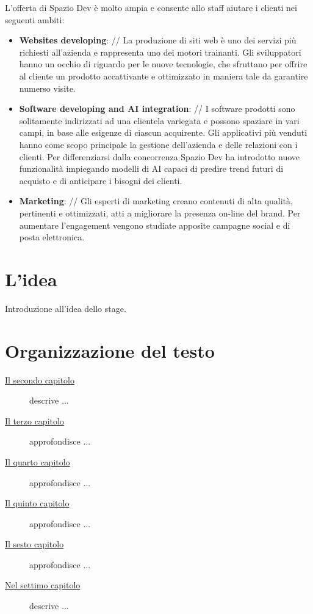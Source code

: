 L'offerta di Spazio Dev è molto ampia e consente allo staff  aiutare i clienti nei seguenti ambiti:
\begin{itemize}
  \item \textbf{Websites developing}: // La produzione di siti web è uno dei servizi più richiesti all'azienda e rappresenta uno dei motori trainanti. Gli sviluppatori hanno un occhio di riguardo per le nuove tecnologie, che sfruttano per offrire al cliente un prodotto accattivante e ottimizzato in maniera tale da garantire numerso visite.
  \item \textbf{Software developing and AI integration}: // I software prodotti sono solitamente indirizzati ad una clientela variegata e possono spaziare in vari campi, in base alle esigenze di ciascun acquirente. Gli applicativi più venduti hanno come scopo principale la gestione dell'azienda e delle relazioni con i clienti. Per differenziarsi dalla concorrenza Spazio Dev ha introdotto nuove funzionalità impiegando modelli di AI capaci di predire trend futuri di acquisto e  di anticipare i bisogni dei clienti.
  \item \textbf{Marketing}: // Gli esperti di marketing creano contenuti di alta qualità, pertinenti e ottimizzati, atti a migliorare la presenza on-line del brand. Per aumentare l'engagement vengono studiate apposite campagne social e di posta elettronica.
\end{itemize}
\section{L'idea}

Introduzione all'idea dello stage.

\section{Organizzazione del testo}

\begin{description}
    \item[{\hyperref[cap:processi-metodologie]{Il secondo capitolo}}] descrive ...
    
    \item[{\hyperref[cap:descrizione-stage]{Il terzo capitolo}}] approfondisce ...
    
    \item[{\hyperref[cap:analisi-requisiti]{Il quarto capitolo}}] approfondisce ...
    
    \item[{\hyperref[cap:progettazione-codifica]{Il quinto capitolo}}] approfondisce ...
    
    \item[{\hyperref[cap:verifica-validazione]{Il sesto capitolo}}] approfondisce ...
    
    \item[{\hyperref[cap:conclusioni]{Nel settimo capitolo}}] descrive ...
\end{description}

